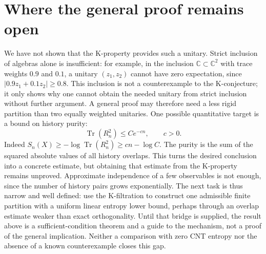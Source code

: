 \documentclass[11pt,a4paper]{article}
\newcommand{\Tr}{\operatorname{Tr}}
\begin{document}
\section{Where the general proof remains open}
We have not shown that the K-property provides such a unitary. Strict inclusion of algebras alone is insufficient: for example, in the inclusion $\mathbb C\subset\mathbb C^2$ with trace weights $0.9$ and $0.1$, a unitary $(z_1,z_2)$ cannot have zero expectation, since $|0.9z_1+0.1z_2|\geq0.8$. This inclusion is not a counterexample to the K-conjecture; it only shows why one cannot obtain the needed unitary from strict inclusion without further argument.
A general proof may therefore need a less rigid partition than two equally weighted unitaries. One possible quantitative target is a bound on history purity:
\[\Tr(R_n^2)\leq Ce^{-cn},\qquad c>0.\]
Indeed $S_n(X)\geq-\log\Tr(R_n^2)\geq cn-\log C$. The purity is the sum of the squared absolute values of all history overlaps. This turns the desired conclusion into a concrete estimate, but obtaining that estimate from the K-property remains unproved. Approximate independence of a few observables is not enough, since the number of history pairs grows exponentially.
The next task is thus narrow and well defined: use the K-filtration to construct one admissible finite partition with a uniform linear entropy lower bound, perhaps through an overlap estimate weaker than exact orthogonality. Until that bridge is supplied, the result above is a sufficient-condition theorem and a guide to the mechanism, not a proof of the general implication. Neither a comparison with zero CNT entropy nor the absence of a known counterexample closes this gap.
\end{document}
